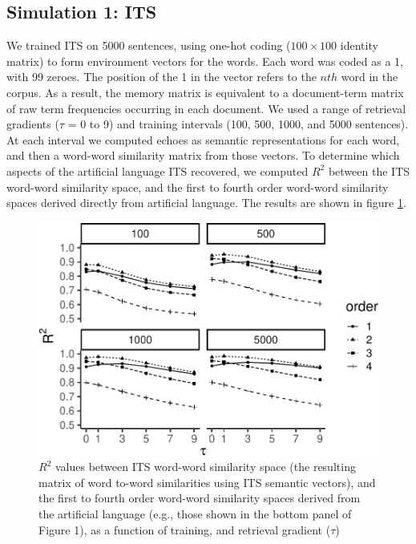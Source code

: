 \documentclass[10pt,letterpaper]{article}
\begin{document}
\subsection{Simulation 1: ITS}

We trained ITS on 5000 sentences, using one-hot coding ($100 \times 100$ identity matrix) to form environment vectors for the words. Each word was coded as a 1, with 99 zeroes. The position of the 1 in the vector refers to the \(nth\) word in the corpus. As a result, the memory matrix is equivalent to a document-term matrix of raw term frequencies occurring in each document. We used a range of retrieval gradients ($\tau$ = 0 to 9) and training intervals (100, 500, 1000, and 5000 sentences). At each interval we computed echoes as semantic representations for each word, and then a word-word similarity matrix from those vectors. To determine which aspects of the artificial language ITS recovered, we computed \(R^2\) between the ITS word-word similarity space, and the first to fourth order word-word similarity spaces derived directly from artificial language. The results are shown in figure \ref{fig:ITSsimple}.

\begin{figure}
\centering
\includegraphics[width=\linewidth]{ITS_cogsci_files/figure-latex/ITSsimple-1.pdf}
\caption{\label{fig:ITSsimple}\(R^2\) values between ITS word-word similarity space (the resulting matrix of word to-word similarities using ITS semantic vectors), and the first to fourth order word-word similarity spaces derived from the artificial language (e.g., those shown in the bottom panel of Figure 1), as a function of training, and retrieval gradient ($\tau$)}
\end{figure}
\end{document}
